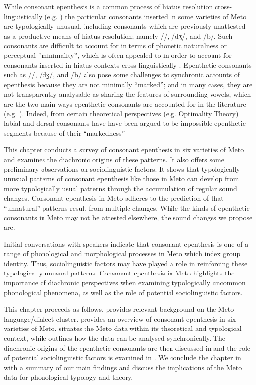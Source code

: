 \documentclass[output=paper]{langscibook}
\begin{document}
While consonant epenthesis is a common process of
hiatus resolution cross-linguistically (e.g. \citealt{ca11})
the particular consonants inserted in some
varieties of Meto are typologically unusual, including
consonants which are previously unattested as a
productive means of hiatus resolution;
namely /\gw/, \mbox{/dʒ/}, and /b/.  
Such consonants are difficult to account for in terms of
phonetic naturalness or perceptual ``minimality'', which is often
appealed to in order to account for consonants
inserted in hiatus contexts cross-linguistically \citep{mo12}.
Epenthetic consonants such as
/\gw/, /dʒ/, and /b/ also pose some challenges to synchronic accounts of epenthesis 
because they are not minimally ``marked'';
and in many cases, they are not
transparently analysable as sharing the features of surrounding vowels, which
are the two main ways epenthetic consonants are accounted for in the literature
 (e.g. \citealp{lo02, dl06, st14}). Indeed, from certain  theoretical perspectives (e.g. Optimality Theory)
labial and dorsal consonants have
have been argued to be
impossible epenthetic segments because of their
``markedness'' \citep{dl06}.

This chapter conducts a survey of consonant epenthesis
in six varieties of Meto and examines the diachronic origins of these patterns.
It also offers some preliminary observations on sociolinguistic factors.
It shows that typologically unusual patterns of consonant 
epenthesis like those in Meto
can develop from more typologically usual patterns
through the accumulation of regular sound changes.
Consonant epenthesis in Meto adheres to the prediction of \citet{bl08}
that ``unnatural'' patterns result from multiple changes.
While the kinds of epenthetic consonants in Meto
may not be attested elsewhere, the sound changes we propose are.

Initial conversations with speakers indicate that
consonant epenthesis is one of a range of phonological and
morphological processes in Meto which index group identity.
Thus, sociolinguistic factors may have played
a role in reinforcing these typologically unusual patterns.
Consonant epenthesis in Meto highlights the
importance of diachronic perspectives when
examining typologically uncommon phonological phenomena,
as well as the role of potential sociolinguistic factors.  

This chapter proceeds as follows.
 provides relevant background on the Meto language/dialect cluster. 
 provides an overview of consonant
epenthesis in six varieties of Meto. 
 situates the Meto data within
its theoretical and typological context, while 
 outlines how the data
can be analysed synchronically.
The diachronic origins of the epenthetic consonants
are then discussed in 
and the role of potential sociolinguistic factors is examined in .
We conclude the chapter in  with a
summary of our main findings and discuss the
implications of the Meto data for phonological typology and theory. 
\end{document}
